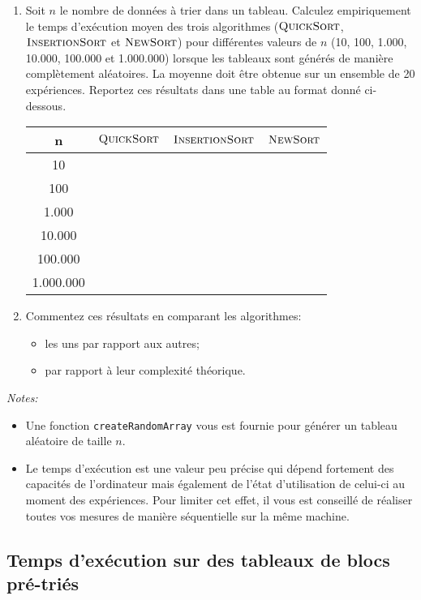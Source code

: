 \documentclass[a4paper,10pt]{article}
\begin{document}
\begin{enumerate}
\item Soit $n$ le nombre de données à trier dans un tableau. Calculez
empiriquement le temps d'exécution moyen des trois algorithmes
($\textnormal{\scshape QuickSort}$, $\textnormal{\scshape InsertionSort}$ et $\textnormal{\scshape NewSort}$) pour
différentes valeurs de $n$ (10, 100, 1.000, 10.000, 100.000 et
1.000.000) lorsque les tableaux sont générés de manière complètement
aléatoires. La moyenne doit être obtenue sur un ensemble de 20
expériences. Reportez ces résultats dans une table au format donné ci-dessous.

\begin{center}
\begin{tabular}{cccc}
	\hline
	n & $\textnormal{\scshape QuickSort}$ & $\textnormal{\scshape InsertionSort}$ & $\textnormal{\scshape NewSort}$ \\
	\hline
	10 & & & \\
	100 & & &\\
	1.000 & & &\\
	10.000 & & &\\
	100.000 & & &\\
	1.000.000 & & &\\
\end{tabular}
\end{center}

\item Commentez ces résultats en comparant les algorithmes:
\begin{itemize}
\item les uns par rapport aux autres;
\item par rapport à leur complexité théorique.
\end{itemize}
\end{enumerate}

{\em Notes:}
\begin{itemize}
\item Une fonction \texttt{createRandomArray} vous est fournie pour générer un tableau aléatoire de taille $n$.
\item Le temps d'exécution est une valeur peu précise qui dépend fortement
des capacités de l'ordinateur mais également de l'état d'utilisation de celui-ci
au moment des expériences. Pour limiter cet effet, il vous est conseillé
de réaliser toutes vos mesures de manière séquentielle sur la même machine.
\end{itemize}

\subsection{Temps d'exécution sur des tableaux de blocs pré-triés}
\end{document}
